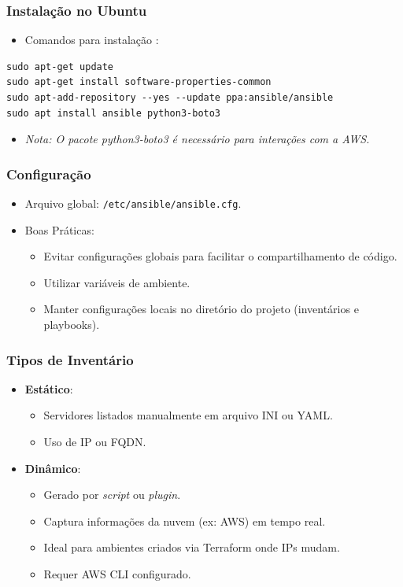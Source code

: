 \documentclass{beamer}
\begin{document}
   \begin{frame}[fragile]
      \frametitle{Instalação no Ubuntu}
      \begin{itemize}
      \item Comandos para instalação :
      \end{itemize}
      \footnotesize
      \begin{verbatim}
sudo apt-get update
sudo apt-get install software-properties-common
sudo apt-add-repository --yes --update ppa:ansible/ansible
sudo apt install ansible python3-boto3
      \end{verbatim}
      \normalsize
      \begin{itemize}
      \item \textit{Nota: O pacote python3-boto3 é necessário para interações com a AWS.}
      \end{itemize}
   \end{frame}

   \begin{frame}
      \frametitle{Configuração}
      \begin{itemize}
      \item Arquivo global: \texttt{/etc/ansible/ansible.cfg}.
      \item Boas Práticas:
      \begin{itemize}
      \item Evitar configurações globais para facilitar o compartilhamento de código.
      \item Utilizar variáveis de ambiente.
      \item Manter configurações locais no diretório do projeto (inventários e playbooks).
      \end{itemize}
      \end{itemize}
   \end{frame}

   \begin{frame}
      \frametitle{Tipos de Inventário}
      \begin{itemize}
      \item \textbf{Estático}:
      \begin{itemize}
      \item Servidores listados manualmente em arquivo INI ou YAML.
      \item Uso de IP ou FQDN.
      \end{itemize}
      \item \textbf{Dinâmico}:
      \begin{itemize}
      \item Gerado por \textit{script} ou \textit{plugin}.
      \item Captura informações da nuvem (ex: AWS) em tempo real.
      \item Ideal para ambientes criados via Terraform onde IPs mudam.
      \item Requer AWS CLI configurado.
      \end{itemize}
      \end{itemize}
   \end{frame}
\end{document}
